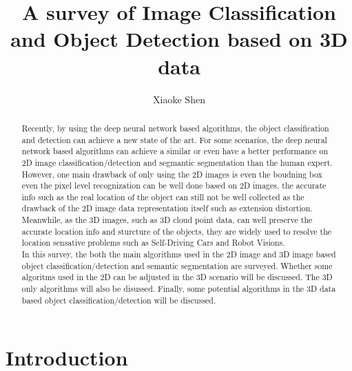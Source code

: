 \documentclass[a4paper,12pt]{article}
\title {A survey of Image Classification and Object Detection based on 3D data }
\author{Xiaoke Shen}
\affil{The Graduate Center, City University of New York}
\date{}
\begin{document}
\maketitle
\begin{abstract}
Recently, by using the deep neural network based algorithms, the object classification and detection can achieve a new state of the art. For some scenarios, the deep neural network based algorithms can achieve a similar or even have a better performance on 2D image classification/detection and segmantic segmentation than the human expert. However, one main drawback of only using the 2D images is even the boudning box even the pixel level recognization can be well done based on 2D images, the accurate info such as the real location of the object can still not be well collected as the drawback of the 2D image data representation itself such as extension distortion. Meanwhile, as the 3D images, such as 3D cloud point data, can well preserve the accurate location info and sturcture of the objects, they are widely used to resolve the location sensative problems such as Self-Driving Cars and Robot Visions.\\
In this survey, the both the main algorithms used in the 2D image and 3D image based object classification/detection and semantic segmentation are surveyed. Whether some algoritms used in the 2D can be adjusted in the 3D scenario will be discussed. The 3D only algorithms will also be disussed. Finally, some potential algorithms in the 3D data based object classification/detection will be discussed.\\
\end{abstract}
\section{Introduction}
\end{document}
